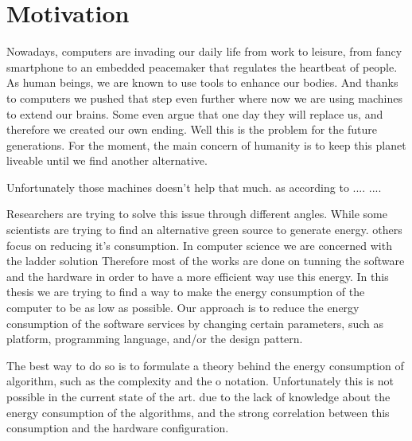 \newpage
\chapter{Motivation}
\label{chapter:introduction}

Nowadays, computers are invading our daily life from work to leisure, from fancy smartphone to an embedded peacemaker that regulates the heartbeat of people.
As human beings, we are known to use tools to enhance our bodies. And thanks to computers we pushed that step even further where now we are using machines to extend our brains. Some even argue that one day they will replace us, and therefore we created our own ending. Well this is the problem for the future generations. For the moment, the main concern of humanity is to keep this planet liveable until we find another alternative.

Unfortunately those machines doesn't help that much. as according to .... ....


Researchers are trying to solve this issue through different angles.
While some scientists are trying to find an alternative green source to generate energy. others focus on reducing it's%
consumption. In computer science we are concerned with the ladder solution %
Therefore most of the works are done on tunning the software and the hardware in order to have a more efficient way use this energy. %
In this thesis we are trying to find a way to make the energy consumption of the computer to be as low as possible. %
Our approach is to reduce the energy consumption of the software services by changing certain parameters, such as platform, programming language, and/or the design pattern.

The best way to do so is to formulate a theory behind the energy consumption of algorithm, such as the complexity and the o notation.
Unfortunately this is not possible in the current state of the art. due to the lack of knowledge about the energy consumption of the algorithms, and the strong correlation between this consumption and the hardware configuration.

